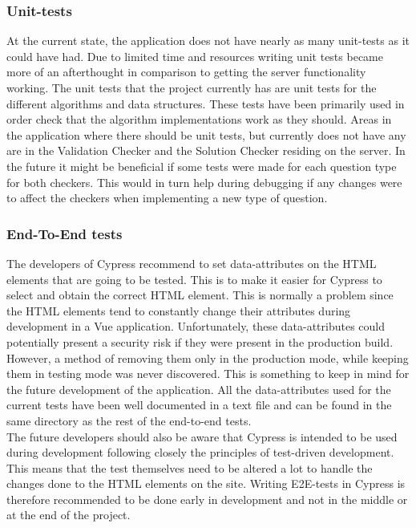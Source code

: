 \subsubsection{Unit-tests}
At the current state, the application does not have nearly as many unit-tests as it could have had. Due to limited time and resources writing unit tests became more of an afterthought in comparison to getting the server functionality working. The unit tests that the project currently has are unit tests for the different algorithms and data structures. These tests have been primarily used in order check that the algorithm implementations work as they should. Areas in the application where there should be unit tests, but currently does not have any are in the Validation Checker and the Solution Checker residing on the server. In the future it might be beneficial if some tests were made for each question type for both checkers. This would in turn help during debugging if any changes were to affect the checkers when implementing a new type of question.
\subsubsection{End-To-End tests}
The developers of Cypress recommend to set data-attributes on the HTML elements that are going to be tested. This is to make it easier for Cypress to select and obtain the correct HTML element. This is normally a problem since the HTML elements tend to constantly change their attributes during development in a Vue application. Unfortunately, these data-attributes could potentially present a security risk if they were present in the production build. However, a method of removing them only in the production mode, while keeping them in testing mode was never discovered. This is something to keep in mind for the future development of the application. All the data-attributes used for the current tests have been well documented in a text file and can be found in the same directory as the rest of the end-to-end tests.\cite{Cypress:BestPractise}
\\[11pt] 
The future developers should also be aware that Cypress is intended to be used during development following closely the principles of test-driven development. This means that the test themselves need to be altered a lot to handle the changes done to the HTML elements on the site. Writing E2E-tests in Cypress is therefore recommended to be done early in development and not in the middle or at the end of the project.

